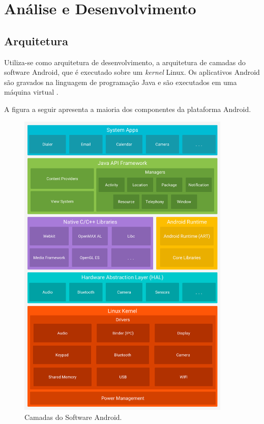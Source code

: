 \section{An\'alise e Desenvolvimento}

\subsection{Arquitetura}
Utiliza-se como arquitetura de desenvolvimento, a arquitetura de camadas do software Android, que \'e executado sobre um \textit{kernel} Linux. Os aplicativos Android s\~ao gravados na linguagem de programa\c{c}\~ao Java e s\~ao executados em uma  {m\'aquina virtual} \cite{Ableson2009}.

A figura a seguir apresenta a maioria dos componentes da plataforma Android. 
\begin{figure}[H]
	\centering
	\caption[Camadas do Software Android]{Camadas do Software Android. \label{fig:figurearquitetura}}
	\includegraphics[height=15cm]{./Figuras/arquitetura_figure.png}%
\end{figure}


